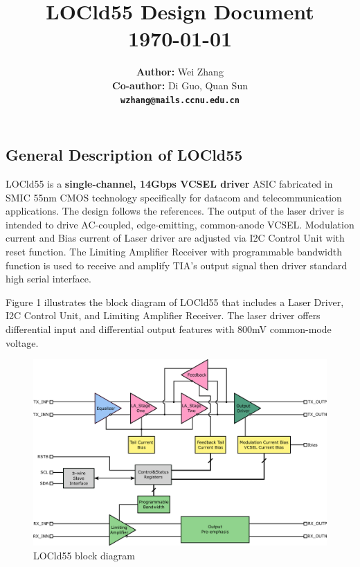 \documentclass[11pt,a4paper]{article}
\title{ \LARGE \textbf{{LOCld55 Design Document}}
        \HRule{2.5pt} \\[0.5cm]
        \normalsize \today
}
\author{
        \textbf{Author:} Wei Zhang\\
        \textbf{Co-author:} Di Guo, Quan Sun\\
        \texttt{\textbf{wzhang@mails.ccnu.edu.cn}}\\
}
\makeatletter
\def\printtitle{{\centering \@title\par}}
\def\printauthor{{\centering \large \@author}}
\makeatother
\begin{document}
\printtitle
\vfill                          %

\printauthor
\begin{spacing}{1.25}           %


\thispagestyle{empty}           %

\newpage

\tableofcontents                %

\thispagestyle{empty}           %

\newpage

\setcounter{page}{1}

\section{General Description of LOCld55}    %

LOCld55 is a \textbf{single-channel, 14Gbps VCSEL driver} ASIC fabricated in SMIC 55nm CMOS technology specifically for datacom and telecommunication applications. The design follows the references\cite{ref1}. The output of the laser driver is intended to drive AC-coupled, edge-emitting, common-anode VCSEL. Modulation current and Bias current of Laser driver are adjusted via I2C Control Unit with reset function. The Limiting Amplifier Receiver with programmable bandwidth function is used to receive and amplify TIA's output signal then driver standard high serial interface. 

Figure 1 illustrates the block diagram of LOCld55 that includes a Laser Driver, I2C Control Unit, and Limiting Amplifier Receiver. The laser driver offers differential input and differential output features with 800mV common-mode voltage.

\begin{figure}[H]
    \includegraphics[width=\linewidth]{./Img/locld55.png}
    \caption{LOCld55 block diagram}
\end{figure}


\end{spacing}
\end{document}
